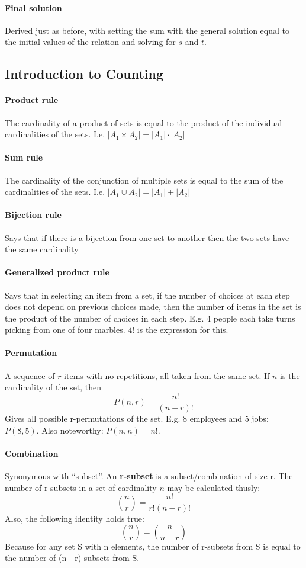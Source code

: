 \documentclass[a4paper]{article}
\begin{document}
\paragraph{Final solution} Derived just as before, with setting the sum with the general solution equal to the initial values of the relation and solving for $s$ and $t$.
\pagebreak
\subsection{Introduction to Counting}
\paragraph{Product rule} The cardinality of a product of sets is equal to the product of the individual cardinalities of the sets. I.e. $|A_1 \times A_2| = |A_1| \cdot |A_2|$
\paragraph{Sum rule} The cardinality of the conjunction of multiple sets is equal to the sum of the cardinalities of the sets. I.e. $|A_1 \cup A_2| = |A_1| + |A_2|$
\paragraph{Bijection rule} Says that if there is a bijection from one set to another then the two sets have the same cardinality
\paragraph{Generalized product rule} Says that in selecting an item from a set, if the number of choices at each step does not depend on previous choices made, then the number of items in the set is the product of the number of choices in each step. E.g. 4 people each take turns picking from one of four marbles. $4!$ is the expression for this.
\paragraph{Permutation} A sequence of $r$ items with no repetitions, all taken from the same set. If $n$ is the cardinality of the set, then
\begin{equation*}
  P(n, r) = \frac{n!}{(n-r)!}
\end{equation*} 
Gives all possible r-permutations of the set. E.g. 8 employees and 5 jobs: $P(8, 5)$. Also noteworthy: $P(n, n) = n!$. 
\paragraph{Combination} Synonymous with ``subset''. An \textbf{r-subset} is a subset/combination of size r. The number of r-subsets in a set of cardinality $n$ may be calculated thusly:
\begin{equation*}
  \binom{n}{r} = \frac{n!}{r!(n-r)!}
\end{equation*}
Also, the following identity holds true:
\begin{equation*}
  \binom{n}{r} = \binom{n}{n-r} 
\end{equation*}
Because for any set S with n elements, the number of r-subsets from S is equal to the number of (n - r)-subsets from S.
\end{document}
